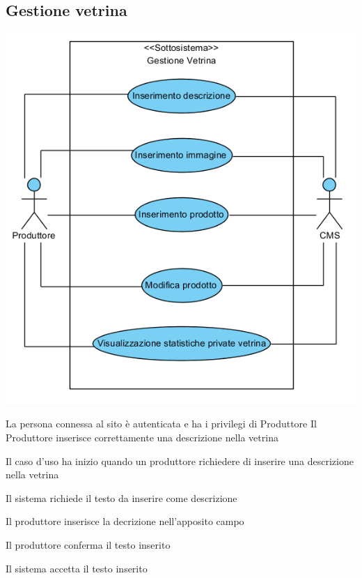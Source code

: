 \subsection{Gestione vetrina}
\begin{center}
   \includegraphics[width=\textwidth]{assets/visualParadigm/GestioneVentrina}
\end{center}
%
{}
{La persona connessa al sito è autenticata e ha i privilegi di Produttore}
{Il Produttore inserisce correttamente una descrizione nella vetrina}
{\begin{enumCU}
		\item Il caso d'uso ha inizio quando un produttore richiedere di inserire una descrizione nella vetrina
		\item Il sistema richiede il testo da inserire come descrizione \label{cuinsdescr:2}
		\item Il produttore inserisce la decrizione nell'apposito campo \label{cuinsdescr:3}
		\item Il produttore conferma il testo inserito
		\item Il sistema accetta il testo inserito
	\end{enumCU}}
